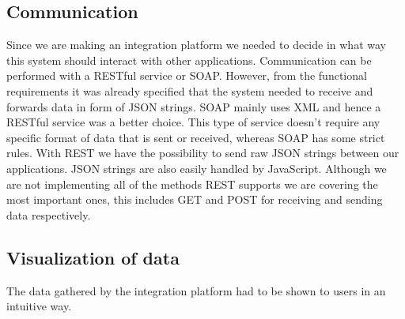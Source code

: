 \subsection{Communication}

Since we are making an integration platform we needed to decide in what way this system should interact with other applications.
Communication can be performed with a RESTful service or SOAP.
However, from the functional requirements it was already specified that the system needed to receive and forwards data in form of JSON strings.
SOAP mainly uses XML and hence a RESTful service was a better choice.
This type of service doesn't require any specific format of data that is sent or received, whereas SOAP has some strict rules.
With REST we have the possibility to send raw JSON strings between our applications.
JSON strings are also easily handled by JavaScript.
Although we are not implementing all of the methods REST supports we are covering the most important ones, this includes GET and POST for receiving and sending data respectively.

\subsection{Visualization of data}

The data gathered by the integration platform had to be shown to users in an intuitive way.

